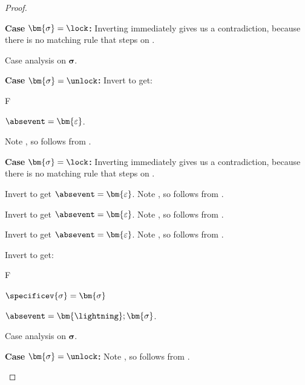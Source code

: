 \documentclass[a4paper,names,dvipsnames]{article}
\begin{document}
\begin{proof}
\begin{description}
\begin{description}
\begin{description}
            \item \textbf{Case }$\bm{\sigma}=\lock$\textbf{:}
              Inverting  immediately gives us a contradiction, because there is no matching rule that steps on \lock.
          \end{description}

          Case analysis on $\bm{\sigma}$.
          \begin{description}
            \item \textbf{Case }$\bm{\sigma}=\unlock$\textbf{:}
              Invert  to get:
              \begin{passumptions}{F}
                \item $\absevent=\bm{\varepsilon}$.
              \end{passumptions}
              Note , so  follows from .

            \item \textbf{Case }$\bm{\sigma}=\lock$\textbf{:}
              Inverting  immediately gives us a contradiction, because there is no matching rule that steps on \lock.
          \end{description}

          Invert  to get $\absevent=\bm{\varepsilon}$.
          Note , so  follows from .

          Invert  to get $\absevent=\bm{\varepsilon}$.
          Note , so  follows from .

          Invert  to get $\absevent=\bm{\varepsilon}$.
          Note , so  follows from .

          Invert  to get:
          \begin{passumptions}{F}
            \item $\specificev{\sigma}=\bm{\sigma}$
            \item $\absevent=\bm{\lightning};\bm{\sigma}$.
          \end{passumptions}
          Case analysis on $\bm{\sigma}$.
          \begin{description}
            \item \textbf{Case }$\bm{\sigma}=\unlock$\textbf{:}
              Note , so  follows from .


\end{description}
\end{description}
\end{description}
\end{proof}
\end{document}
